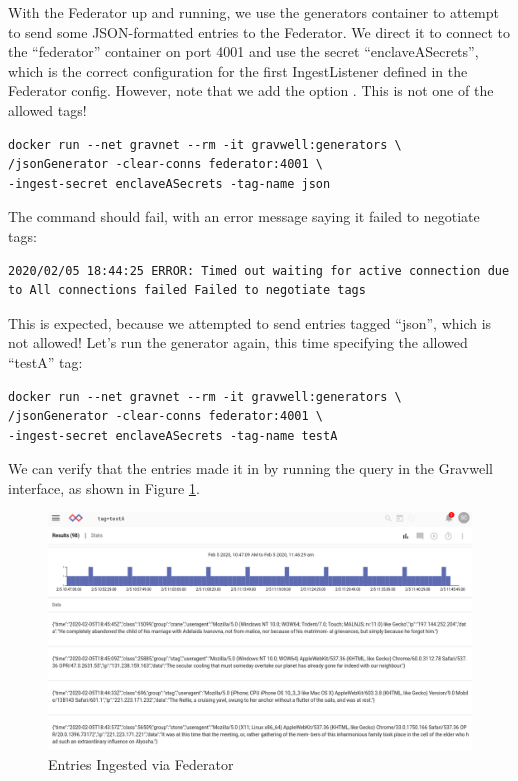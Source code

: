With the Federator up and running, we use the generators container to attempt to send some JSON-formatted
entries to the Federator. We direct it to connect to the ``federator'' container on port 4001 and
use the secret ``enclaveASecrets'', which is the correct configuration
for the first IngestListener defined in the Federator config. However, note that we
add the option . This is not one of the allowed tags!

\begin{Verbatim}[breaklines=true]
docker run --net gravnet --rm -it gravwell:generators \
/jsonGenerator -clear-conns federator:4001 \
-ingest-secret enclaveASecrets -tag-name json
\end{Verbatim}

The command should fail, with an error message saying it
failed to negotiate tags:

\begin{Verbatim}[breaklines=true]
2020/02/05 18:44:25 ERROR: Timed out waiting for active connection due to All connections failed Failed to negotiate tags
\end{Verbatim}

This is expected, because we attempted to send entries tagged ``json'', which is not allowed! Let's run the generator again, this time specifying the allowed ``testA'' tag:

\begin{Verbatim}[breaklines=true]
docker run --net gravnet --rm -it gravwell:generators \
/jsonGenerator -clear-conns federator:4001 \
-ingest-secret enclaveASecrets -tag-name testA
\end{Verbatim}

We can verify that the entries made it in by running the query  in the Gravwell interface, as shown in Figure \ref{fig:federator-lab-1}.

\begin{figure}[H]
	\includegraphics{images/igst-federator-lab.png}
	\caption{Entries Ingested via Federator}
	\label{fig:federator-lab-1}
\end{figure}

